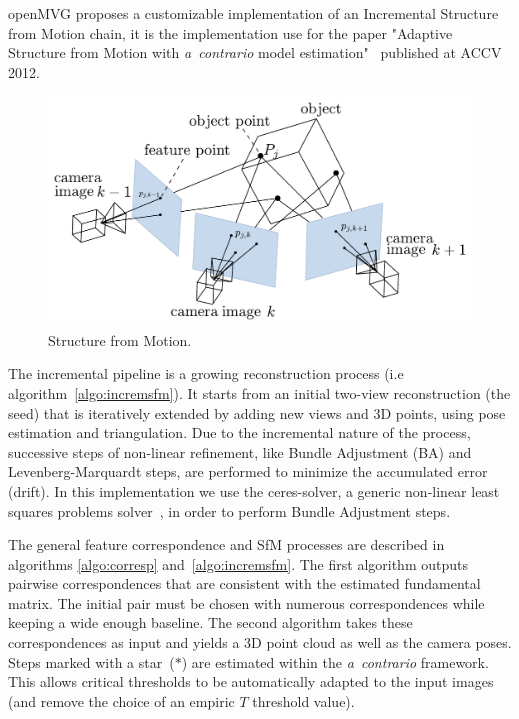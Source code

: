 \documentclass[11pt, letterpaper]{report}
\begin{document}
\newpage
openMVG proposes a customizable implementation of an Incremental Structure from Motion chain, it is the implementation use for the paper "Adaptive Structure from Motion with {\em a~contrario} model estimation"~\cite{MOULON/ACCV12} published at ACCV 2012.

\begin{figure}[h!]
\begin{center}
\includegraphics[scale=.6]{figures/SfM_geometry.pdf}
\caption{Structure from Motion.}
\label{fig:SfM}
\end{center}
\end{figure}

The incremental pipeline is a growing reconstruction process (i.e algorithm~\ref{algo:incremsfm}). It starts from an initial two-view reconstruction (the seed) that is iteratively extended by adding new views and 3D points, using pose estimation and triangulation. Due to the incremental nature of the process, successive steps of non-linear refinement, like Bundle Adjustment (BA) and Levenberg-Marquardt steps, are performed to minimize the accumulated error (drift). In this implementation we use the ceres-solver, a generic non-linear least squares problems solver~\cite{ceres-manual}, in order to perform Bundle Adjustment steps.\newline

\newpage
The general feature correspondence and SfM processes are described in algorithms \ref{algo:corresp} and~\ref{algo:incremsfm}. The first algorithm outputs pairwise correspondences that are consistent with the estimated fundamental matrix. The initial pair must be chosen with numerous correspondences while keeping a wide enough baseline. The second algorithm takes these correspondences as input and yields a 3D point cloud as well as the camera poses. Steps marked with a star~($*$) are estimated within the {\em a~contrario} framework. This allows critical thresholds to be automatically adapted to the input images (and remove the choice of an empiric $T$ threshold value).
\end{document}
